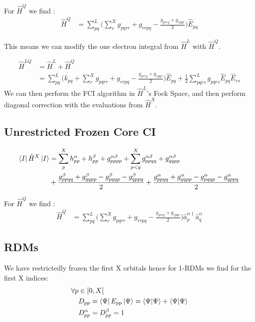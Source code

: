 For $\hat{{H}}^{Q}$ we find :
\begin{align}
   \hat{{H}}^{Q}  &= \sum_{pq}^L \Big(\sum^{X}_r g_{pqrr} + g_{rrpq} - \frac{g_{prrq} + g_{rpqr}}{2}  \Big)  \hat{E}_{pq}
\end{align}

This means we can modify the one electron integral from $\hat{{H}}^{L}$ with $\hat{{H}}^{Q}$.

\begin{align}
   \hat{{H}}^{LQ}  &=  \hat{{H}}^{L} + \hat{{H}}^{Q} \\
                  &=  \sum_{pq}^L \Big(k_{pq} + \sum^{X}_r g_{pqrr} + g_{rrpq} - \frac{g_{prrq} + g_{rpqr}}{2} \Big) \hat{E}_{pq} + \frac{1}{2} \sum_{pqrs}^L g_{pqrs} \hat{E}_{pq} \hat{E}_{rs}
\end{align}
We can then perform the FCI algorithm in $\hat{{H}}^{L}$'s Fock Space, and then perform diagonal correction with the evaluations from $\hat{{H}}^{X}$.


\subsection{Unrestricted Frozen Core CI}
  \begin{align}
    \bra{I} \hat{{H}}^{X} \ket{I} &= \sum^{X}_{p} h_{pp}^\alpha +  h_{pp}^\beta + g_{pppp}^{\alpha \beta} + \sum^{X}_{p<q} g_{ppqq}^{\alpha \beta} + g_{qqpp}^{\alpha \beta} \\
    &+ \frac{g_{ppqq}^\beta + g_{qqpp}^\beta  - g_{pqqp}^\beta - g_{qppq}^\beta }{2} + \frac{g_{ppqq}^\alpha + g_{qqpp}^\alpha - g_{pqqp}^\alpha - g_{qppq}^\alpha }{2}
   \end{align}

   For $\hat{{H}}^{Q}$ we find :
   \begin{align}
      \hat{{H}}^{Q}  &= \sum_{pq}^L \Big(\sum^{X}_r g_{pqrr} + g_{rrpq} - \frac{g_{prrq} + g_{rpqr}}{2}  \Big)  \hat{a}^{\alpha \dagger}_p \hat{a}^{\alpha}_q 
   \end{align}

\subsection{RDMs}

We have restrictedly frozen the first X orbitals hence for 1-RDMs we find for the first X indices:
\begin{align}
  \forall p &\in [0,X[ \\
  & D_{pp} = \bra{\Psi} E_{pp} \ket{\Psi} = \braket{\Psi}{\Psi} + \braket{\Psi}{\Psi} \\
  & D_{pp}^\alpha = D_{pp}^\beta = 1
\end{align}


